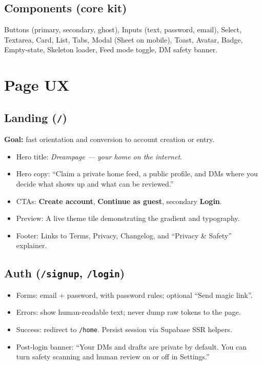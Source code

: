\documentclass[11pt]{article}
\begin{document}
\subsection{Components (core kit)}
Buttons (primary, secondary, ghost), Inputs (text, password, email), Select, Textarea, Card, List, Tabs, Modal (Sheet on mobile), Toast, Avatar, Badge, Empty-state, Skeleton loader, Feed mode toggle, DM safety banner.

\section{Page UX}

\subsection{Landing (\texttt{/})}
\textbf{Goal:} fast orientation and conversion to account creation or entry.
\begin{itemize}
  \item Hero title: \emph{Dreampage --- your home on the internet}.
  \item Hero copy: ``Claim a private home feed, a public profile, and DMs where you decide what shows up and what can be reviewed.''
  \item CTAs: \textbf{Create account}, \textbf{Continue as guest}, secondary \textbf{Login}.
  \item Preview: A live theme tile demonstrating the gradient and typography.
  \item Footer: Links to Terms, Privacy, Changelog, and ``Privacy \& Safety'' explainer.
\end{itemize}

\subsection{Auth (\texttt{/signup}, \texttt{/login})}
\begin{itemize}
  \item Forms: email + password, with password rules; optional ``Send magic link''.
  \item Errors: show human-readable text; never dump raw tokens to the page.
  \item Success: redirect to \texttt{/home}. Persist session via Supabase SSR helpers.
  \item Post-login banner: ``Your DMs and drafts are private by default. You can turn safety scanning and human review on or off in Settings.''
\end{itemize}
\end{document}
